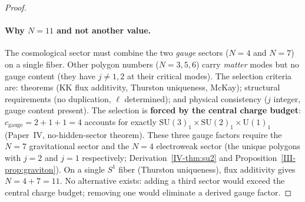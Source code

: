 \begin{proof}
\paragraph{Why $N = 11$ and not another value.}
The cosmological sector must combine the two \emph{gauge}
sectors ($N = 4$ and $N = 7$) on a single fiber.
Other polygon numbers ($N = 3, 5, 6$) carry \emph{matter}
modes but no gauge content (they have $j \ne 1, 2$
at their critical modes).
The selection criteria are:
theorems (KK flux additivity, Thurston uniqueness, McKay);
structural requirements (no duplication, $\ell$ determined);
and physical consistency ($j$ integer, gauge content present).
The selection is \textbf{forced by the central charge budget}:
$c_{\mathrm{gauge}} = 2 + 1 + 1 = 4$ accounts for exactly
$\mathrm{SU}(3)_1 \times \mathrm{SU}(2)_1 \times \mathrm{U}(1)_1$
(Paper~IV, no-hidden-sector theorem).
These three gauge factors require the $N = 7$ gravitational
sector and the $N = 4$ electroweak sector (the unique polygons
with $j = 2$ and $j = 1$ respectively;
Derivation~\ref*{IV-thm:su2}
and Proposition~\ref*{III-prop:graviton}).
On a single $S^1$ fiber (Thurston uniqueness),
flux additivity gives $N = 4 + 7 = 11$.
No alternative exists: adding a third sector would exceed
the central charge budget; removing one would eliminate a
derived gauge factor.


\end{proof}
